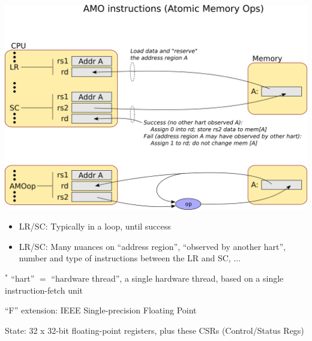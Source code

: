 \documentclass{article}
\begin{document}
\begin{center}
  \includegraphics[width=7in]{Figs/LR_SC_AMO.png}

  \vspace{1in}

  \begin{minipage}[t]{8in}
    \begin{itemize}\Large
    \item LR/SC: Typically in a loop, until success

    \item LR/SC: Many nuances on ``address region'', ``observed by
      another hart'', number and type of instructions between the LR
      and SC, ...
    \end{itemize}

    \vspace*{5ex}

    {\large $^*$ ``hart'' $=$ ``hardware thread'', a single hardware
      thread, based on a single instruction-fetch unit}
  \end{minipage}
\end{center}


\clearpage


\begin{center}
{\Huge
  ``F'' extension: IEEE Single-precision Floating Point}
\end{center}

\vspace*{0.1in}

{\LARGE State: 32 x 32-bit floating-point registers, plus these CSRs (Control/Status Regs)}
\end{document}
